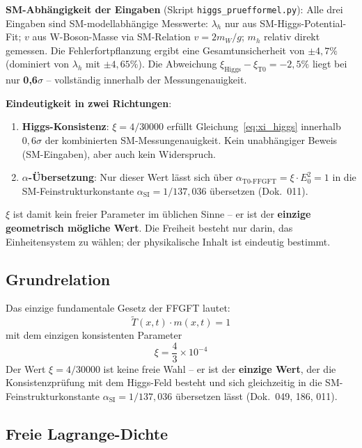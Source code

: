 \textbf{SM-Abhängigkeit der Eingaben} (Skript \texttt{higgs\_pruefformel.py}):
Alle drei Eingaben sind SM-modellabhängige Messwerte:
$\lambda_h$ nur aus SM-Higgs-Potential-Fit;
$v$ aus W-Boson-Masse via SM-Relation $v = 2m_W/g$;
$m_h$ relativ direkt gemessen.
Die Fehlerfortpflanzung ergibt eine Gesamtunsicherheit von $\pm 4{,}7\%$
(dominiert von $\lambda_h$ mit $\pm 4{,}65\%$).
Die Abweichung $\xi_{\text{Higgs}} - \xi_{\text{T0}} = -2{,}5\%$
liegt bei nur \textbf{0,6$\sigma$} -- vollständig innerhalb der
Messungenauigkeit.

\textbf{Eindeutigkeit in zwei Richtungen}:
\begin{enumerate}
    \item \textbf{Higgs-Konsistenz}: $\xi = 4/30000$ erfüllt
          Gleichung~\eqref{eq:xi_higgs} innerhalb $0{,}6\sigma$
          der kombinierten SM-Messungenauigkeit.
          Kein unabhängiger Beweis (SM-Eingaben), aber auch
          kein Widerspruch.
    \item \textbf{$\alpha$-Übersetzung}: Nur dieser Wert lässt sich
          über $\alpha_{\text{T0-FFGFT}} = \xi \cdot E_0^2 = 1$ in die
          SM-Feinstrukturkonstante $\alpha_{\text{SI}} = 1/137{,}036$
          übersetzen (Dok.~011).
\end{enumerate}

$\xi$ ist damit kein freier Parameter im üblichen Sinne -- er ist
der \textbf{einzige geometrisch mögliche Wert}. Die Freiheit
besteht nur darin, das Einheitensystem zu wählen; der physikalische
Inhalt ist eindeutig bestimmt.

\subsection{Grundrelation}

Das einzige fundamentale Gesetz der FFGFT lautet:
\begin{equation}
    \tilde{T}(x,t) \cdot m(x,t) = 1
    \label{eq:fundamental}
\end{equation}
mit dem einzigen konsistenten Parameter
\begin{equation}
    \xi = \frac{4}{3} \times 10^{-4}
\end{equation}
Der Wert $\xi = 4/30000$ ist keine freie Wahl -- er ist der
\textbf{einzige Wert}, der die Konsistenzprüfung mit dem
Higgs-Feld besteht und sich gleichzeitig in die
SM-Feinstrukturkonstante $\alpha_{\text{SI}} = 1/137{,}036$
übersetzen lässt (Dok.~049, 186, 011).

\subsection{Freie Lagrange-Dichte}

